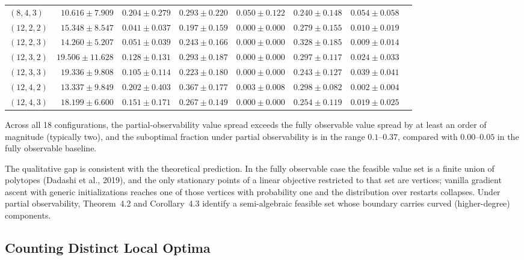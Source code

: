 \documentclass{article}
\theoremstyle{definition}
\theoremstyle{remark}
\begin{document}
\begin{table}[h]
\begin{tabular}{@{}lrrrrrrr@{}}
    $(8,4,3)$  & $10.616 \pm 7.909$  & $0.204 \pm 0.279$ & $0.293 \pm 0.220$ & $0.050 \pm 0.122$ & $0.240 \pm 0.148$ & $0.054 \pm 0.058$ \\
    $(12,2,2)$ & $15.348 \pm 8.547$  & $0.041 \pm 0.037$ & $0.197 \pm 0.159$ & $0.000 \pm 0.000$ & $0.279 \pm 0.155$ & $0.010 \pm 0.019$ \\
    $(12,2,3)$ & $14.260 \pm 5.207$  & $0.051 \pm 0.039$ & $0.243 \pm 0.166$ & $0.000 \pm 0.000$ & $0.328 \pm 0.185$ & $0.009 \pm 0.014$ \\
    $(12,3,2)$ & $19.506 \pm 11.628$ & $0.128 \pm 0.131$ & $0.293 \pm 0.187$ & $0.000 \pm 0.000$ & $0.297 \pm 0.117$ & $0.024 \pm 0.033$ \\
    $(12,3,3)$ & $19.336 \pm 9.808$  & $0.105 \pm 0.114$ & $0.223 \pm 0.180$ & $0.000 \pm 0.000$ & $0.243 \pm 0.127$ & $0.039 \pm 0.041$ \\
    $(12,4,2)$ & $13.337 \pm 9.849$  & $0.202 \pm 0.403$ & $0.367 \pm 0.177$ & $0.003 \pm 0.008$ & $0.298 \pm 0.082$ & $0.002 \pm 0.004$ \\
    $(12,4,3)$ & $18.199 \pm 6.600$  & $0.151 \pm 0.171$ & $0.267 \pm 0.149$ & $0.000 \pm 0.000$ & $0.254 \pm 0.119$ & $0.019 \pm 0.025$ \\
    \bottomrule
  \end{tabular}
  \label{tab:expA}
\end{table}
 
Across all 18 configurations, the partial-observability value spread exceeds the fully observable value spread by at least an order of magnitude (typically two), and the suboptimal fraction under partial observability is in the range $0.1$--$0.37$, compared with $0.00$--$0.05$ in the fully observable baseline.

The qualitative gap is consistent with the theoretical prediction. In the fully observable case the feasible value set is a finite union of polytopes (Dadashi
et al., 2019), and the only stationary points of a linear objective restricted to that set are vertices; vanilla gradient ascent with generic initializations
reaches one of those vertices with probability one and the distribution over restarts collapses. Under partial observability, Theorem~4.2 and Corollary~4.3 identify a semi-algebraic feasible set whose boundary carries curved (higher-degree) components. 

 
\subsection{Counting Distinct Local Optima}
\label{app:experiment-B}
\end{document}

